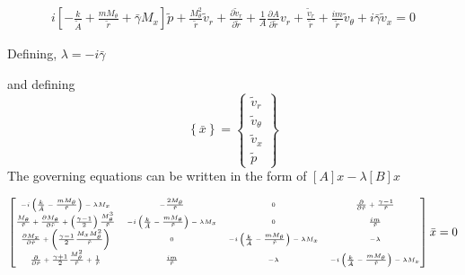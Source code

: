\begin{align*}
	 \boxed{i \left[ -\frac{k}{\tilde{A}} + 
	 \frac{mM_{\theta}}{\tilde{r}} +
	 \bar{\gamma}M_x \right] \tilde{p} + 
	 \frac{M_{\theta}^2}{\tilde{r}}\tilde{v}_r + 
     \frac{\partial \tilde{v}_r}{\partial \tilde{r}} +
	 \frac{1}{A}\frac{\partial A}{\partial \tilde{r}}{v}_r+ 
 \frac{\tilde{v}_r  }{\tilde{r}} + \frac{im}{\tilde{r}}\tilde{v}_\theta + i \bar{\gamma} \tilde{v}_x = 0}
\end{align*}

Defining, $\lambda = -i \bar{\gamma} $ 

and defining 
\[ \left\{ \bar{x} \right\} =
\begin{Bmatrix}
    \tilde{v}_r \\
    \tilde{v}_{\theta} \\
    \tilde{v}_x \\
    \tilde{p}
\end{Bmatrix}
\]
The governing equations can be written in the form of $[A]{x} - \lambda [B]{x}$

\begin{equation*}
    \tiny
    \begin{bmatrix}
        -i \left( \frac{k}{\bar{A}} - \frac{mM_{\theta}}{\tilde{r}} \right) - \lambda M_x &
        -\frac{2 M_{\theta}}{\tilde{r}} &
        0 &
        \frac{\partial}{\partial \tilde{r}} + \frac{\gamma - 1}{\tilde{r}}\\ 
        \frac{ M_{\theta}}{\tilde{r}} + \frac{\partial M_{\theta}}{\partial \tilde{r}} + \left( \frac{\gamma - 1}{2} \right) \frac{M_{\theta}^3}{\tilde{r}}& 
        -i \left( \frac{k}{\bar{A}} - \frac{mM_{\theta}}{\tilde{r}} \right) - \lambda M_x & 
        0 &
        \frac{i m }{\tilde{r}}  \\
        \frac{\partial M_x}{\partial \tilde{r}} + \left( \frac{\gamma -1}{2}\frac{M_x M_{\theta}^2}{\tilde{r}}\right) & 0&
        -i \left( \frac{k}{\bar{A}} - \frac{mM_{\theta}}{\tilde{r}} \right) - \lambda M_x & -\lambda\\
        \frac{\partial}{\partial \tilde{r}} + \frac{\gamma +1}{2}\frac{M_{\theta}^2}{\tilde{r}} + \frac{1}{\tilde{r}} & \frac{im}{\tilde{r}} & -\lambda&  
        -i \left( \frac{k}{\bar{A}} - \frac{mM_{\theta}}{\tilde{r}} \right) - \lambda M_x 
    \end{bmatrix}\bar{x} = 0
\end{equation*}



